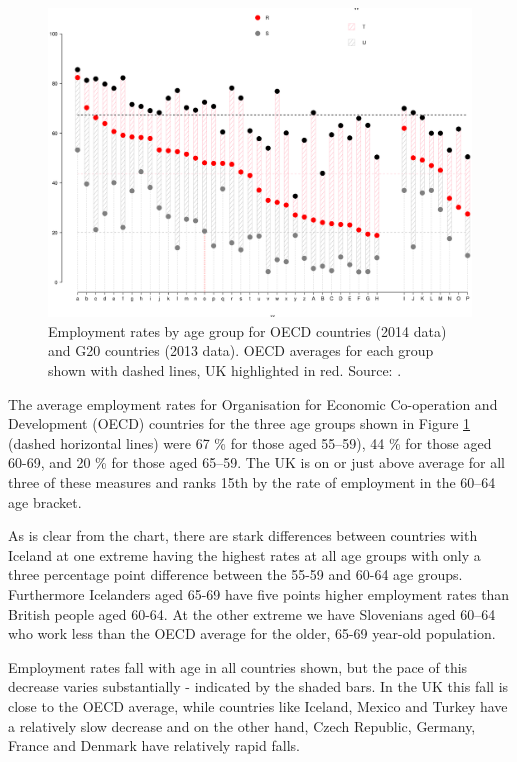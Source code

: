 \documentclass[11 pt, a4paper]{report}
\begin{document}
\begin{figure}[hbtp!]
\includegraphics[width=\textwidth]{../figures/Fig5.5.eps}
\caption{Employment rates by age group for OECD countries (2014 data) and G20 countries (2013 data). OECD averages for each group shown with dashed lines, UK highlighted in red. Source: \citet{OECD2015}.}
\label{Fig:OECD}
\end{figure}

The average employment rates for Organisation for Economic Co-operation and Development (OECD) countries for the three age groups shown in Figure \ref{Fig:OECD} (dashed horizontal lines)  were 67 \% for those aged 55--59), 44 \% for those aged 60-69, and 20 \% for those aged 65--59. The UK is on or just above average for all three of these measures and ranks 15th by the rate of employment in the 60--64 age bracket. 

As is clear from the chart, there are stark differences between countries with Iceland at one extreme having the highest rates at all age groups with only a three percentage point difference between the 55-59 and 60-64 age groups. Furthermore Icelanders aged 65-69 have five points higher employment rates than British people aged 60-64. At the other extreme we have Slovenians aged 60--64 who work less than the OECD average for the older, 65-69 year-old population. 

Employment rates fall with age in all countries shown, but the pace of this decrease varies substantially - indicated by the shaded bars.  In the UK this fall is close to the OECD average, while countries like Iceland, Mexico and Turkey have a relatively slow decrease and on the other hand, Czech Republic,  Germany, France and Denmark have relatively rapid falls. 
\clearpage
\vspace{-1cm}
\end{document}
